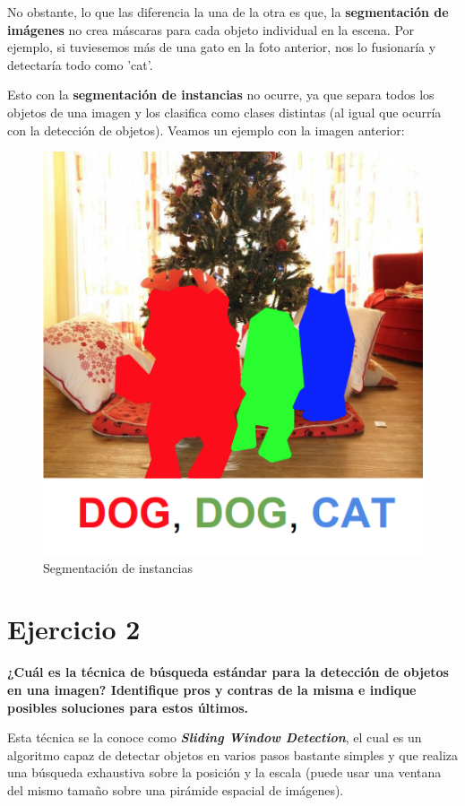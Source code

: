 \documentclass[11pt,a4paper]{article}
\begin{document}
No obstante, lo que las diferencia la una de la otra es que, la \textbf{segmentación de imágenes} no crea máscaras para cada objeto individual en la escena. Por
ejemplo, si tuviesemos más de una gato en la foto anterior, nos lo fusionaría y detectaría todo como 'cat'.

Esto con la \textbf{segmentación de instancias} no ocurre, ya que separa todos los objetos de una imagen y los clasifica como clases distintas (al igual que ocurría
con la detección de objetos). Veamos un ejemplo con la imagen anterior:
\begin{figure}[H]
\centering
\includegraphics[scale=0.5]{img/image_segmentation.png}
\caption{Segmentación de instancias}
\end{figure}


\section*{Ejercicio 2}

\textbf{¿Cuál es la técnica de búsqueda estándar para la detección de objetos en una imagen? Identifique pros y contras de la misma e indique
posibles soluciones para estos últimos.}

Esta técnica se la conoce como \textbf{\textit{Sliding Window Detection}}, el cual es un algoritmo capaz de detectar objetos en varios pasos bastante simples y que
realiza una búsqueda exhaustiva sobre la posición y la escala (puede usar una ventana del mismo tamaño sobre una pirámide espacial de imágenes).
\end{document}
